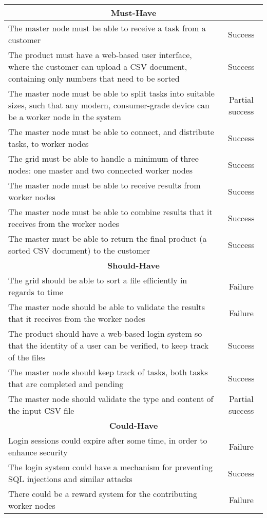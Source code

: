 \begin{table}
    \begin{tabular}{|p{10cm}|c|}
        \hline
        \multicolumn{2}{|c|}{\textbf{Must-Have}} \\ \hline
        The master node must be able to receive a task from a customer & Success \\ \hline
        The product must have a web-based user interface, where the customer can upload a CSV document, containing only numbers that need to be sorted & Success \\ \hline
        The master node must be able to split tasks into suitable sizes, such that any modern, consumer-grade device can be a worker node in the system & Partial success \\ \hline
        The master node must be able to connect, and distribute tasks, to worker nodes & Success \\ \hline
        The grid must be able to handle a minimum of three nodes: one master and two connected worker nodes & Success \\ \hline
        The master node must be able to receive results from worker nodes & Success \\ \hline
        The master node must be able to combine results that it receives from the worker nodes & Success \\ \hline
        The master must be able to return the final product (a sorted CSV document) to the customer & Success \\ \hline

        \multicolumn{2}{|c|}{\textbf{Should-Have}} \\ \hline
        The grid should be able to sort a file efficiently in regards to time & Failure \\ \hline
        The master node should be able to validate the results that it receives from the worker nodes &  Failure \\ \hline
        The product should have a web-based login system so that the identity of a user can be verified, to keep track of the files & Success \\ \hline
        The master node should keep track of tasks, both tasks that are completed and pending & Success \\ \hline
        The master node should validate the type and content of the input CSV file & Partial success \\ \hline

        \multicolumn{2}{|c|}{\textbf{Could-Have}} \\ \hline
        Login sessions could expire after some time, in order to enhance security & Failure \\ \hline
        The login system could have a mechanism for preventing SQL injections and similar attacks & Success \\ \hline
        There could be a reward system for the contributing worker nodes & Failure \\ \hline


\end{tabular}
\end{table}
